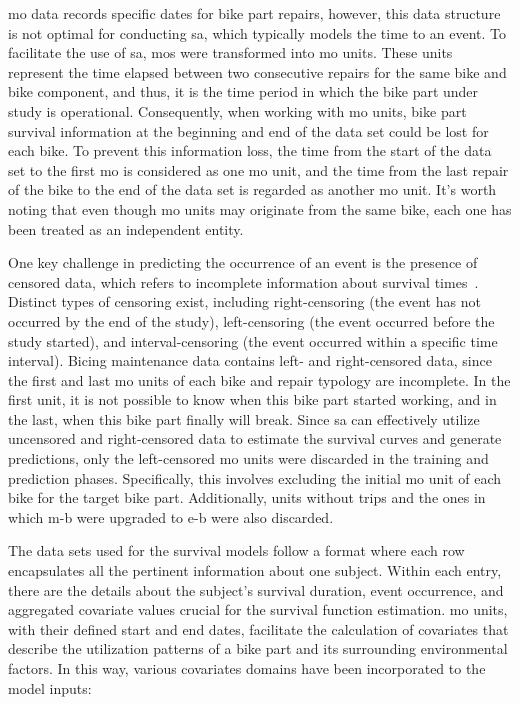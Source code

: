 \ac{mo} data records specific dates for bike part repairs, however, this data structure is not optimal for conducting \ac{sa}, which typically models the time to an event. To facilitate the use of \ac{sa}, \acp{mo} were transformed into \ac{mo} units. These units represent the time elapsed between two consecutive repairs for the same bike and bike component, and thus, it is the time period in which the bike part under study is operational. Consequently, when working with \ac{mo} units, bike part survival information at the beginning and end of the data set could be lost for each bike. To prevent this information loss, the time from the start of the data set to the first \ac{mo} is considered as one \ac{mo} unit, and the time from the last repair of the bike to the end of the data set is regarded as another \ac{mo} unit. It's worth noting that even though \ac{mo} units may originate from the same bike, each one has been treated as an independent entity.

One key challenge in predicting the occurrence of an event is the presence of censored data, which refers to incomplete information about survival times~\cite{Leung1997, Gijbels2010}. Distinct types of censoring exist, including right-censoring (the event has not occurred by the end of the study), left-censoring (the event occurred before the study started), and interval-censoring (the event occurred within a specific time interval). Bicing maintenance data contains left- and right-censored data, since the first and last \ac{mo} units of each bike and repair typology are incomplete. In the first unit, it is not possible to know when this bike part started working, and in the last, when this bike part finally will break. Since \ac{sa} can effectively utilize uncensored and right-censored data to estimate the survival curves and generate predictions, only the left-censored \ac{mo} units were discarded in the training and prediction phases. Specifically, this involves excluding the initial \ac{mo} unit of each bike for the target bike part. Additionally, units without trips and the ones in which \ac{m-b} were upgraded to \ac{e-b} were also discarded.

The data sets used for the survival models follow a format where each row encapsulates all the pertinent information about one subject. Within each entry, there are the details about the subject's survival duration, event occurrence, and aggregated covariate values crucial for the survival function estimation. \ac{mo} units, with their defined start and end dates, facilitate the calculation of covariates that describe the utilization patterns of a bike part and its surrounding environmental factors. In this way, various covariates domains have been incorporated to the model inputs:

